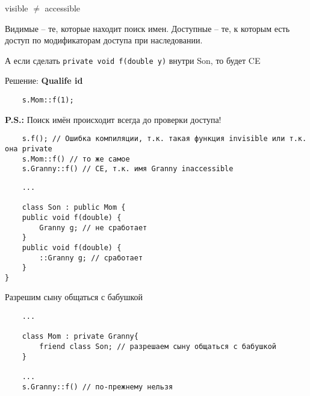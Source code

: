 \documentclass[12pt]{article}
\newcommand{\ps}{\textbf{P.S.: }}
\begin{document}
\begin{center}
visible $\not=$ accessible
\end{center}

Видимые -- те, которые находит поиск имен. 
Доступные -- те, к которым есть доступ по модификаторам доступа при наследовании. 

А если сделать \texttt{private void f(double y)} внутри Son, то будет CE

Решение: \textbf{Qualife id}

\begin{lstlisting}
	s.Mom::f(1);
\end{lstlisting}

\ps Поиск имён происходит всегда до проверки доступа!

\begin{lstlisting}
	s.f(); // Ошибка компиляции, т.к. такая функция invisible или т.к. она private
	s.Mom::f() // то же самое
	s.Granny::f() // CE, т.к. имя Granny inaccessible
\end{lstlisting}

\begin{lstlisting}
	...
	
	class Son : public Mom {
	public void f(double) {
		Granny g; // не сработает
	}
	public void f(double) {
		::Granny g; // сработает
	} 
}
\end{lstlisting}

Разрешим сыну общаться с бабушкой 

\begin{lstlisting}
	...

	class Mom : private Granny{
		friend class Son; // разрешаем сыну общаться с бабушкой
	}
	
	...
	s.Granny::f() // по-прежнему нельзя
\end{lstlisting}
\end{document}
